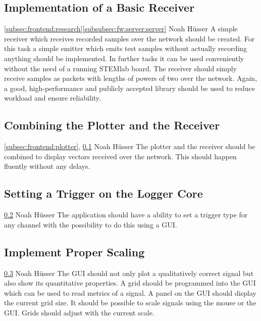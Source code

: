 \documentclass[a4paper,oneside]{alpenspecs/alpenspecs}
\begin{document}
\subsection{Implementation of a Basic Receiver}
\label{subsec:frontend:receiver}
\wpac
    {}
    {}
    {}
    {\ref{subsec:frontend:research}\ref{subsubsec:fw:server:server}}
    {}
    {Noah Hüsser}
    {%
        A simple receiver which receives recorded samples over the network should be created.
        For  this task  a simple  emitter which  emits test  samples without
        actually recording anything should be implemented.
        In further  tasks it can  be used conveniently  without the need  of a
        running STEMlab board.
        The receiver should simply receive  samples as packets with lengths of
        powers of two over the network.
        Again, a  good, high-performance and publicly  accepted library should
        be used to reduce workload and ensure reliability.
    }

\subsection{Combining the Plotter and the Receiver}
\label{subsec:frontend:combining}
\wpac
    {}
    {}
    {}
    {\ref{subsec:frontend:plotter}, \ref{subsec:frontend:receiver}}
    {}
    {Noah Hüsser}
    {%
        The plotter  and the  receiver should be  combined to  display vectors
        received over  the network.  This  should happen fluently  without any
        delays.
    }

\subsection{Setting a Trigger on the Logger Core}
\label{subsec:frontend:trig}
\wpac
    {}
    {}
    {}
    {\ref{subsec:frontend:combining}}
    {}
    {Noah Hüsser}
    {%
        The application  should have a ability  to set a trigger  type for
        any channel with the possibility to do this using a GUI.
    }

\subsection{Implement Proper Scaling}
\label{subsec:frontend:scaling}
\wpac
    {}
    {}
    {}
    {\ref{subsec:frontend:trig}}
    {}
    {Noah Hüsser}
    {%
        The GUI should  not only plot a qualitatively correct  signal but also
        show its  quantitative properties.  A  grid should be  programmed into
        the GUI which can be used to  read metrics of a signal. A panel on the
        GUI should  display the current grid  size.  It should be  possible to
        scale signals using the mouse or the GUI. Grids should adjust with the
        current scale.
    }
\end{document}
